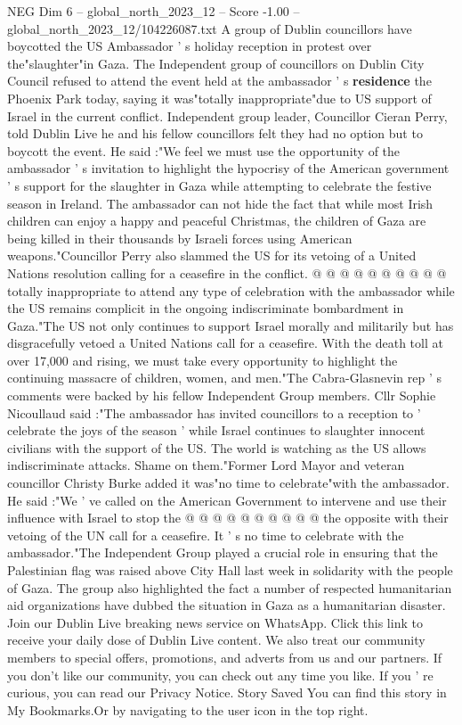 \begin{textsample}{NEG Dim 6 – global\_north\_2023\_12 – Score -1.00 – global\_north\_2023\_12/104226087.txt}  \label{ex:f6_neg_318}
A group of Dublin councillors have boycotted the US Ambassador ' s holiday reception in protest over the"slaughter"in Gaza.
The Independent group of councillors on Dublin City Council refused to attend the event held at the ambassador ' s \textbf{residence} the Phoenix Park today, saying it was"totally inappropriate"due to US support of Israel in the current conflict.
Independent group leader, Councillor Cieran Perry, told Dublin Live he and his fellow councillors felt they had no option but to boycott the event.
He said :"We feel we must use the opportunity of the ambassador ' s invitation to highlight the hypocrisy of the American government ' s support for the slaughter in Gaza while attempting to celebrate the festive season in Ireland.
The ambassador can not hide the fact that while most Irish children can enjoy a happy and peaceful Christmas, the children of Gaza are being killed in their thousands by Israeli forces using American weapons."Councillor Perry also slammed the US for its vetoing of a United Nations resolution calling for a ceasefire in the conflict. @ @ @ @ @ @ @ @ @ @ totally inappropriate to attend any type of celebration with the ambassador while the US remains complicit in the ongoing indiscriminate bombardment in Gaza."The US not only continues to support Israel morally and militarily but has disgracefully vetoed a United Nations call for a ceasefire.
With the death toll at over 17,000 and rising, we must take every opportunity to highlight the continuing massacre of children, women, and men."The Cabra-Glasnevin rep ' s comments were backed by his fellow Independent Group members.
Cllr Sophie Nicoullaud said :"The ambassador has invited councillors to a reception to ' celebrate the joys of the season ' while Israel continues to slaughter innocent civilians with the support of the US.
The world is watching as the US allows indiscriminate attacks.
Shame on them."Former Lord Mayor and veteran councillor Christy Burke added it was"no time to celebrate"with the ambassador.
He said :"We ' ve called on the American Government to intervene and use their influence with Israel to stop the @ @ @ @ @ @ @ @ @ @ the opposite with their vetoing of the UN call for a ceasefire.
It ' s no time to celebrate with the ambassador."The Independent Group played a crucial role in ensuring that the Palestinian flag was raised above City Hall last week in solidarity with the people of Gaza.
The group also highlighted the fact a number of respected humanitarian aid organizations have dubbed the situation in Gaza as a humanitarian disaster.
Join our Dublin Live breaking news service on WhatsApp.
Click this link to receive your daily dose of Dublin Live content.
We also treat our community members to special offers, promotions, and adverts from us and our partners.
If you don't like our community, you can check out any time you like.
If you ' re curious, you can read our Privacy Notice.
Story Saved You can find this story in My Bookmarks.Or by navigating to the user icon in the top right.

\end{textsample}
